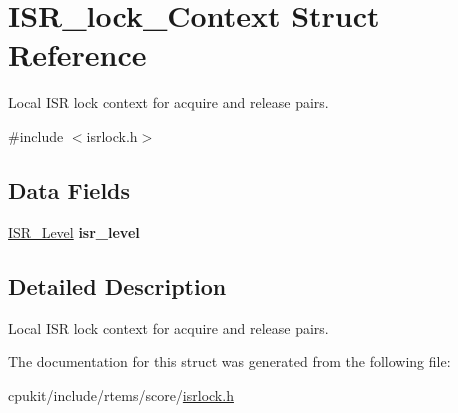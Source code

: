 \hypertarget{structISR__lock__Context}{}\section{I\+S\+R\+\_\+lock\+\_\+\+Context Struct Reference}
\label{structISR__lock__Context}


Local I\+SR lock context for acquire and release pairs.  




{\ttfamily \#include $<$isrlock.\+h$>$}

\subsection*{Data Fields}
\begin{DoxyCompactItemize}
\item 
\mbox{\label{structISR__lock__Context_ad0a3775e2c659c2c3e72e8cdf1b77f31}} 
\mbox{\hyperlink{group__RTEMSScoreISR_gad1af728587ebcefec5b5cf94fc7909b9}{I\+S\+R\+\_\+\+Level}} {\bfseries isr\+\_\+level}
\end{DoxyCompactItemize}


\subsection{Detailed Description}
Local I\+SR lock context for acquire and release pairs. 

The documentation for this struct was generated from the following file\+:\begin{DoxyCompactItemize}
\item 
cpukit/include/rtems/score/\mbox{\hyperlink{isrlock_8h}{isrlock.\+h}}\end{DoxyCompactItemize}
